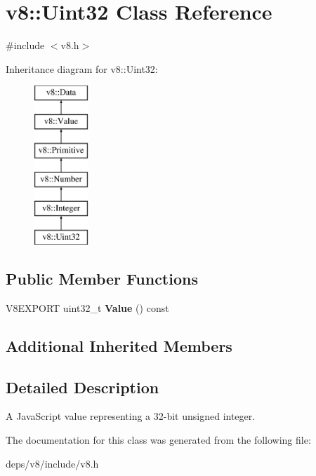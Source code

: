 \hypertarget{classv8_1_1_uint32}{}\section{v8\+:\+:Uint32 Class Reference}
\label{classv8_1_1_uint32}


{\ttfamily \#include $<$v8.\+h$>$}

Inheritance diagram for v8\+:\+:Uint32\+:\begin{figure}[H]
\begin{center}
\leavevmode
\includegraphics[height=6.000000cm]{classv8_1_1_uint32}
\end{center}
\end{figure}
\subsection*{Public Member Functions}
\begin{DoxyCompactItemize}
\item 
\hypertarget{classv8_1_1_uint32_a3dbd90a6aaa70f98b8d145fe2f6b88bb}{}V8\+E\+X\+P\+O\+R\+T uint32\+\_\+t {\bfseries Value} () const \label{classv8_1_1_uint32_a3dbd90a6aaa70f98b8d145fe2f6b88bb}

\end{DoxyCompactItemize}
\subsection*{Additional Inherited Members}


\subsection{Detailed Description}
A Java\+Script value representing a 32-\/bit unsigned integer. 

The documentation for this class was generated from the following file\+:\begin{DoxyCompactItemize}
\item 
deps/v8/include/v8.\+h\end{DoxyCompactItemize}
